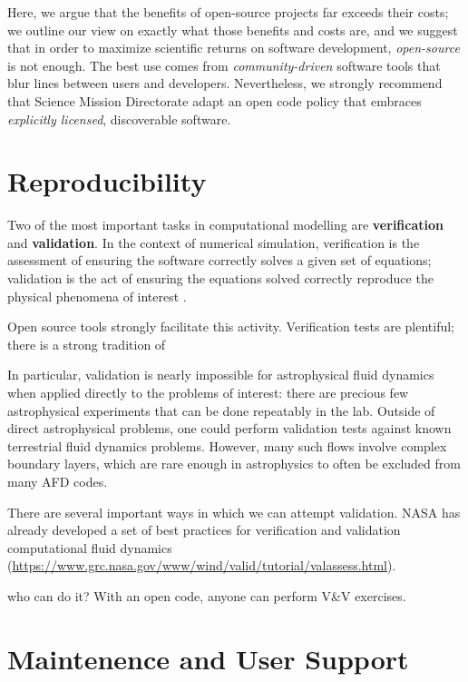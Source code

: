 \documentclass{paper}
\begin{document}
Here, we argue that the benefits of open-source projects far exceeds their costs; we outline our view on exactly what those benefits and costs are, and we suggest that in order to maximize scientific returns on software development, \emph{open-source} is not enough. The best use comes from \emph{community-driven} software tools that blur lines between users and developers. Nevertheless, we strongly recommend that Science Mission Directorate adapt an open code policy that embraces \emph{explicitly licensed}, discoverable software. 

\section{Reproducibility}
\label{sec:repro}

Two of the most important tasks in computational modelling are \textbf{verification} and \textbf{validation}. In the context of numerical simulation, verification is the assessment of ensuring the software correctly solves a given set of equations; validation is the act of ensuring the equations solved correctly reproduce the physical phenomena of interest \citep{2002PrAeS..38..209O}. 

Open source tools strongly facilitate this activity. Verification tests are plentiful; there is a strong tradition of 


In particular, validation is nearly impossible for astrophysical fluid dynamics when applied directly to the problems of interest: there are precious few astrophysical experiments that can be done repeatably in the lab. Outside of direct astrophysical problems, one could perform validation tests against known terrestrial fluid dynamics problems.  However, many such flows involve complex boundary layers, which are rare enough in astrophysics to often be excluded from many AFD codes. 

There are several important ways in which we can attempt validation. NASA has already developed a set of best practices for verification and validation computational fluid dynamics (\url{https://www.grc.nasa.gov/www/wind/valid/tutorial/valassess.html}). 


who can do it? With an open code, anyone can perform V\&V exercises. 

\section{Maintenence and User Support}
\label{sec:support}
\end{document}
